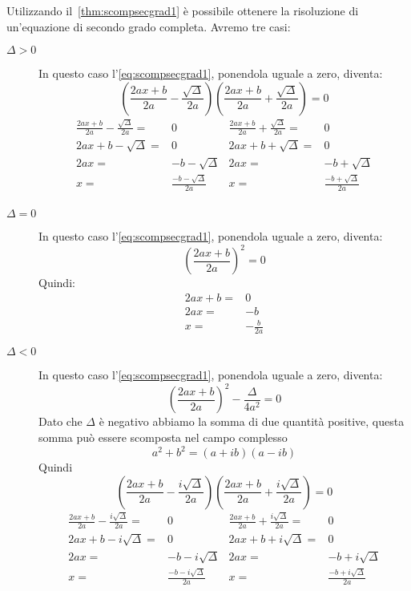 \begin{comm}
	Utilizzando il~\cref{thm:scompsecgrad1} è possibile ottenere la risoluzione di un'equazione di secondo grado completa. Avremo tre casi:
	\begin{description}
		\item[$\Delta>0$]In questo caso l'\cref{eq:scompsecgrad1}, ponendola uguale a zero, diventa:  
		\begin{equation*}
		\left(\frac{2ax+b}{2a}-\frac{\sqrt{\Delta}}{2a}\right)\left(\frac{2ax+b}{2a}+\frac{\sqrt{\Delta}}{2a}\right)=0
		\end{equation*}
		\begin{align*}
		\frac{2ax+b}{2a}-\frac{\sqrt{\Delta}}{2a}=&0&\frac{2ax+b}{2a}+\frac{\sqrt{\Delta}}{2a}=&0\\
		2ax+b-\sqrt{\Delta}=&0&2ax+b+\sqrt{\Delta}=&0\\
		2ax=&-b-\sqrt{\Delta}&2ax=&-b+\sqrt{\Delta}\\
		x=&\frac{-b-\sqrt{\Delta}}{2a}&x=&\frac{-b+\sqrt{\Delta}}{2a}\\
		\end{align*}
	\item[$\Delta=0$]In questo caso l'\cref{eq:scompsecgrad1}, ponendola uguale a zero, diventa:
	\begin{equation}
	\left(\dfrac{2ax+b}{2a}\right)^2=0
	\end{equation}Quindi:
	\begin{align*}
	2ax+b=&0\\
	2ax=&-b\\
	x=&-\frac{b}{2a}
	\end{align*}
	\item[$\Delta<0$]In questo caso l'\cref{eq:scompsecgrad1}, ponendola uguale a zero, diventa:
	\begin{equation*}
	\left(\dfrac{2ax+b}{2a}\right)^2-\dfrac{\Delta}{4a^2}=0
	\end{equation*}
	Dato che $\Delta$ è negativo abbiamo la somma di due quantità positive, questa somma può essere scomposta nel campo complesso \[a^2+b^2=(a+ib)(a-ib)\] Quindi
	\begin{equation*}
	\left(\frac{2ax+b}{2a}-\frac{i\sqrt{\Delta}}{2a}\right)\left(\frac{2ax+b}{2a}+\frac{i\sqrt{\Delta}}{2a}\right)=0
	\end{equation*}
		\begin{align*}
	\frac{2ax+b}{2a}-\frac{i\sqrt{\Delta}}{2a}=&0&\frac{2ax+b}{2a}+\frac{i\sqrt{\Delta}}{2a}=&0\\
	2ax+b-i\sqrt{\Delta}=&0&2ax+b+i\sqrt{\Delta}=&0\\
	2ax=&-b-i\sqrt{\Delta}&2ax=&-b+i\sqrt{\Delta}\\
	x=&\frac{-b-i\sqrt{\Delta}}{2a}&x=&\frac{-b+i\sqrt{\Delta}}{2a}\\
	\end{align*}
	\end{description}
\end{comm}
